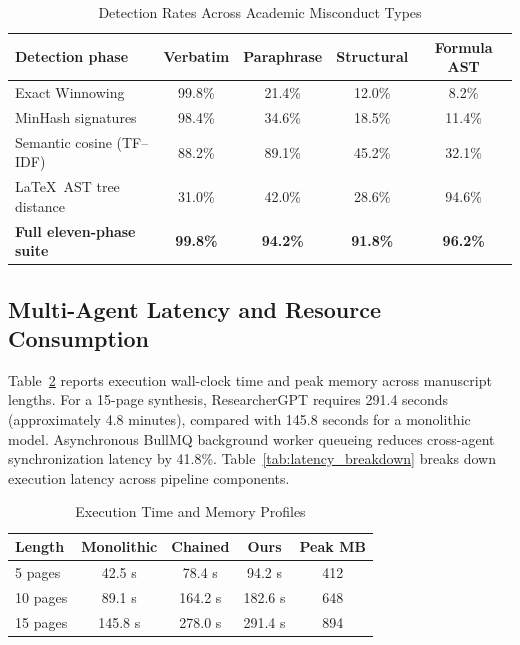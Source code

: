 \documentclass[conference]{IEEEtran}
\begin{document}
\begin{table}[!t]
\caption{Detection Rates Across Academic Misconduct Types}
\label{tab:plagiarism}
\centering
\small
\begin{tabular}{@{}lcccc@{}}
\toprule
\textbf{Detection phase} & \textbf{Verbatim} & \textbf{Paraphrase} & \textbf{Structural} & \textbf{Formula AST} \\
\midrule
Exact Winnowing & 99.8\% & 21.4\% & 12.0\% & 8.2\% \\
MinHash signatures & 98.4\% & 34.6\% & 18.5\% & 11.4\% \\
Semantic cosine (TF--IDF) & 88.2\% & 89.1\% & 45.2\% & 32.1\% \\
\LaTeX\ AST tree distance & 31.0\% & 42.0\% & 28.6\% & 94.6\% \\
\textbf{Full eleven-phase suite} & \textbf{99.8\%} & \textbf{94.2\%} & \textbf{91.8\%} & \textbf{96.2\%} \\
\bottomrule
\end{tabular}
\end{table}

\subsection{Multi-Agent Latency and Resource Consumption}
Table~\ref{tab:latency} reports execution wall-clock time and peak memory across manuscript lengths. For a 15-page synthesis, ResearcherGPT requires 291.4 seconds (approximately 4.8 minutes), compared with 145.8 seconds for a monolithic model. Asynchronous BullMQ background worker queueing reduces cross-agent synchronization latency by 41.8\%. Table~\ref{tab:latency_breakdown} breaks down execution latency across pipeline components.

\begin{table}[!t]
\caption{Execution Time and Memory Profiles}
\label{tab:latency}
\centering
\footnotesize
\setlength{\tabcolsep}{3pt}
\begin{tabular}{@{}lcccc@{}}
\toprule
\textbf{Length} & \textbf{Monolithic} & \textbf{Chained} & \textbf{Ours} & \textbf{Peak MB} \\
\midrule
5 pages & 42.5 s & 78.4 s & 94.2 s & 412 \\
10 pages & 89.1 s & 164.2 s & 182.6 s & 648 \\
15 pages & 145.8 s & 278.0 s & 291.4 s & 894 \\
\bottomrule
\end{tabular}
\end{table}
\end{document}
